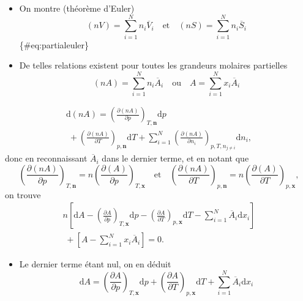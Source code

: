 \documentclass[
  ignorenonframetext,
]{beamer}
\providecommand{\tightlist}{%
  \setlength{\itemsep}{0pt}\setlength{\parskip}{0pt}}
\begin{document}
\begin{frame}
\begin{itemize}
\tightlist
\item
  On montre (théorème d'Euler) \[
  \left ( n V \right ) = \sum _ {i = 1} ^ N n _ i \overline{V} _ i \quad \mathrm{et} \quad \left ( n S \right ) = \sum _ {i = 1} ^ N n _ i \overline{S} _ i
  \] \{\#eq:partialeuler\}
\item
  De telles relations existent pour toutes les grandeurs molaires
  partielles \[
  \left ( n A \right ) = \sum _ {i = 1} ^ N n _ i \overline{A} _ i \quad \mathrm{ou} \quad A = \sum _ {i = 1} ^ N x _ i \overline{A} _ i
  \]
\end{itemize}
\end{frame}

\begin{frame}
\begin{multline*}
\mathrm{d} \left ( n A \right ) = \left ( \frac{\partial \left ( n A \right )}{\partial p} \right ) _ {T, \mathbf{n}} \mathrm{d} p \\
\; + \left ( \frac{\partial \left ( n A \right )}{\partial T} \right ) _ {p, \mathbf{n}} \mathrm{d} T + \sum _ {i = 1} ^ N \left ( \frac{\partial \left ( n A \right )}{\partial n _ i} \right ) _ {p, T, n _ {j \ne i}} \mathrm{d} n _ i,
\end{multline*} donc en reconnaissant \(\overline{A} _ i\) dans le
dernier terme, et en notant que \[
\left ( \frac{\partial \left ( n A \right )}{\partial p} \right ) _ {T, \mathbf{n}} = n \left ( \frac{\partial \left ( A \right )}{\partial p} \right ) _ {T, \mathbf{x}}
\quad \mathrm{et} \quad
\left ( \frac{\partial \left ( n A \right )}{\partial T} \right ) _ {p, \mathbf{n}} = n \left ( \frac{\partial \left ( A \right )}{\partial T} \right ) _ {p, \mathbf{x}},
\] on trouve \begin{multline*}
n \left [ \mathrm{d} A - \left ( \frac{\partial A}{\partial p} \right ) _ {T, \mathbf{x}} \mathrm{d} p - \left ( \frac{\partial A}{\partial T} \right ) _ {p, \mathbf{x}} \mathrm{d} T - \sum _ {i = 1} ^ N \overline{A} _ i \mathrm{d} x _ i \right ] \\
\; + \left [ A - \sum _ {i = 1} ^ N x _ i \overline{A} _ i \right ] = 0.
\end{multline*}
\end{frame}

\begin{frame}
\begin{itemize}
\tightlist
\item
  Le dernier terme étant nul, on en déduit \[
  \mathrm{d} A = \left ( \frac{\partial A}{\partial p} \right ) _ {T, \mathbf{x}} \mathrm{d} p + \left ( \frac{\partial A}{\partial T} \right ) _ {p, \mathbf{x}} \mathrm{d} T + \sum _ {i = 1} ^ N \overline{A} _ i \mathrm{d} x _ i
  \]
\end{itemize}
\end{frame}
\end{document}
